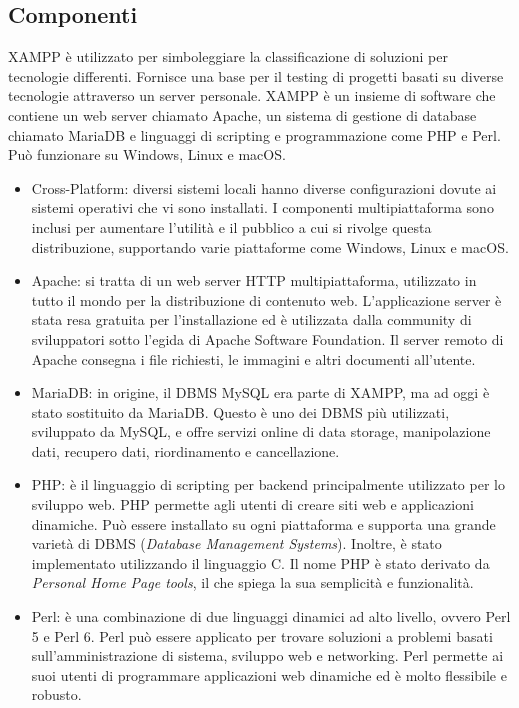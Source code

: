 \subsection{Componenti}
XAMPP è utilizzato per simboleggiare la classificazione di soluzioni per tecnologie differenti. Fornisce una base per il testing di progetti basati su diverse tecnologie attraverso un server personale. XAMPP è un insieme di software che contiene un web server chiamato Apache, un sistema di gestione di database chiamato MariaDB e linguaggi di scripting e programmazione come PHP e Perl. Può funzionare su Windows, Linux e macOS.
\begin{itemize}
    \item Cross-Platform: diversi sistemi locali hanno diverse configurazioni dovute ai sistemi operativi che vi sono installati. I componenti multipiattaforma sono inclusi per aumentare l'utilità e il pubblico a cui si rivolge questa distribuzione, supportando varie piattaforme come Windows, Linux e macOS.
    \item Apache: si tratta di un web server HTTP multipiattaforma, utilizzato in tutto il mondo per la distribuzione di contenuto web. L'applicazione server è stata resa gratuita per l'installazione ed è utilizzata dalla community di sviluppatori sotto l'egida di Apache Software Foundation. Il server remoto di Apache consegna i file richiesti, le immagini e altri documenti all'utente.
    \item MariaDB: in origine, il DBMS MySQL era parte di XAMPP, ma ad oggi è stato sostituito da MariaDB. Questo è uno dei DBMS più utilizzati, sviluppato da MySQL, e offre servizi online di data storage, manipolazione dati, recupero dati, riordinamento e cancellazione.
    \item PHP: è il linguaggio di scripting per backend principalmente utilizzato per lo sviluppo web. PHP permette agli utenti di creare siti web e applicazioni dinamiche. Può essere installato su ogni piattaforma e supporta una grande varietà di DBMS (\textit{Database Management Systems}). Inoltre, è stato implementato utilizzando il linguaggio C. Il nome PHP è stato derivato da \textit{Personal Home Page tools}, il che spiega la sua semplicità e funzionalità.
    \item Perl: è una combinazione di due linguaggi dinamici ad alto livello, ovvero Perl 5 e Perl 6. Perl può essere applicato per trovare soluzioni a problemi basati sull'amministrazione di sistema, sviluppo web e networking. Perl permette ai suoi utenti di programmare applicazioni web dinamiche ed è molto flessibile e robusto.

\end{itemize}

